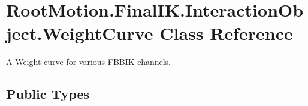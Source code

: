 \hypertarget{class_root_motion_1_1_final_i_k_1_1_interaction_object_1_1_weight_curve}{}\section{Root\+Motion.\+Final\+I\+K.\+Interaction\+Object.\+Weight\+Curve Class Reference}
\label{class_root_motion_1_1_final_i_k_1_1_interaction_object_1_1_weight_curve}


A Weight curve for various F\+B\+B\+IK channels.  


\subsection*{Public Types}
